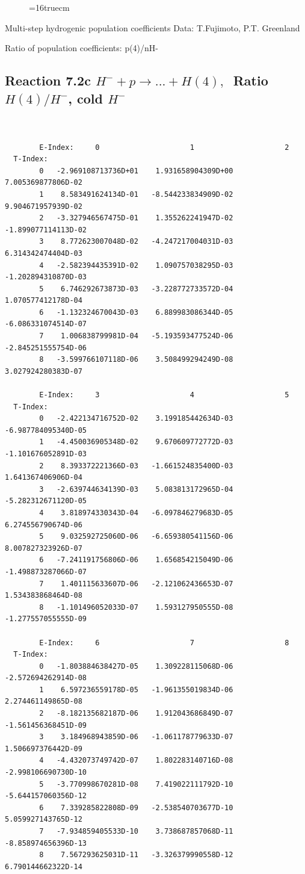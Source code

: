 \documentclass[12pt,dvips]{article}
\begin{document}
\begin{figure} \label{7.2b}
\epsfxsize=16truecm
\end{figure}
\newpage

 Multi-step hydrogenic population coefficients
 Data: T.Fujimoto, P.T. Greenland

 Ratio of population coefficients: p(4)/nH-

\subsection{
Reaction 7.2c $ H^- + p \rightarrow ...+ H(4) , \  $
Ratio $H(4)/H^- $, cold $H^-$
}

\begin{small}\begin{verbatim}


        E-Index:     0                     1                     2
  T-Index:
        0   -2.969108713736D+01    1.931658904309D+00    7.005369877806D-02
        1    8.583491624134D-01   -8.544233834909D-02    9.904671957939D-02
        2   -3.327946567475D-01    1.355262241947D-02   -1.899077114113D-02
        3    8.772623007048D-02   -4.247217004031D-03    6.314342474404D-03
        4   -2.582394435391D-02    1.090757038295D-03   -1.202894310870D-03
        5    6.746292673873D-03   -3.228772733572D-04    1.070577412178D-04
        6   -1.132324670043D-03    6.889983086344D-05   -6.086331074514D-07
        7    1.006838799981D-04   -5.193593477524D-06   -2.845251555754D-06
        8   -3.599766107118D-06    3.508499294249D-08    3.027924280383D-07

        E-Index:     3                     4                     5
  T-Index:
        0   -2.422134716752D-02    3.199185442634D-03   -6.987784095340D-05
        1   -4.450036905348D-02    9.670609772772D-03   -1.101676052891D-03
        2    8.393372221366D-03   -1.661524835400D-03    1.641367406906D-04
        3   -2.639744634139D-03    5.083813172965D-04   -5.282312671120D-05
        4    3.818974330343D-04   -6.097846279683D-05    6.274556790674D-06
        5    9.032592725060D-06   -6.659380541156D-06    8.007827323926D-07
        6   -7.241191756806D-06    1.656854215049D-06   -1.498873287066D-07
        7    1.401115633607D-06   -2.121062436653D-07    1.534383868464D-08
        8   -1.101496052033D-07    1.593127950555D-08   -1.277557055555D-09

        E-Index:     6                     7                     8
  T-Index:
        0   -1.803884638427D-05    1.309228115068D-06   -2.572694262914D-08
        1    6.597236559178D-05   -1.961355019834D-06    2.274461149865D-08
        2   -8.182135682187D-06    1.912043686849D-07   -1.561456368451D-09
        3    3.184968943859D-06   -1.061178779633D-07    1.506697376442D-09
        4   -4.432073749742D-07    1.802283140716D-08   -2.998106690730D-10
        5   -3.770998670281D-08    7.419022111792D-10   -5.644157060356D-12
        6    7.339285822808D-09   -2.538540703677D-10    5.059927143765D-12
        7   -7.934859405533D-10    3.738687857068D-11   -8.858974656396D-13
        8    7.567293625031D-11   -3.326379990558D-12    6.790144662322D-14


\end{verbatim}
\end{small}
\end{document}
